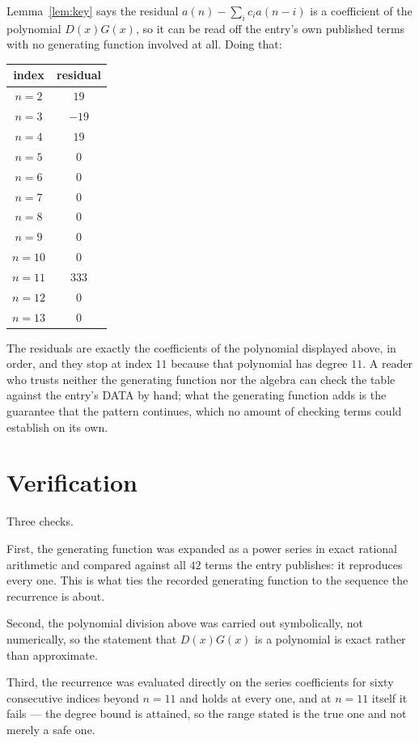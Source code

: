 \documentclass[11pt,a4paper]{article}
\theoremstyle{plain}
\theoremstyle{definition}
\begin{document}
Lemma~\ref{lem:key} says the residual $a(n)-\sum_ic_ia(n-i)$ is a coefficient of the
polynomial $D(x)G(x)$, so it can be read off the entry's own published terms with no
generating function involved at all. Doing that:
\begin{center}
\begin{tabular}{cc}
index & residual \\ \hline
$n=2$ & $19$ \\
$n=3$ & $-19$ \\
$n=4$ & $19$ \\
$n=5$ & $0$ \\
$n=6$ & $0$ \\
$n=7$ & $0$ \\
$n=8$ & $0$ \\
$n=9$ & $0$ \\
$n=10$ & $0$ \\
$n=11$ & $333$ \\
$n=12$ & $0$ \\
$n=13$ & $0$
\end{tabular}
\end{center}
The residuals are exactly the coefficients of the polynomial displayed above, in order, and
they stop at index $11$ because that polynomial has degree $11$. A reader who trusts
neither the generating function nor the algebra can check the table against the entry's DATA
by hand; what the generating function adds is the guarantee that the pattern continues, which
no amount of checking terms could establish on its own.

\section{Verification}

Three checks.

First, the generating function was expanded as a power series in exact rational arithmetic and
compared against all $42$ terms the entry publishes: it reproduces every one. This is
what ties the recorded generating function to the sequence the recurrence is about.

Second, the polynomial division above was carried out symbolically, not numerically, so the
statement that $D(x)G(x)$ is a polynomial is exact rather than approximate.

Third, the recurrence was evaluated directly on the series coefficients for sixty consecutive
indices beyond $n=11$ and holds at every one, and at $n=11$ itself it fails --- the
degree bound is attained, so the range stated is the true one and not merely a safe one.
\end{document}
